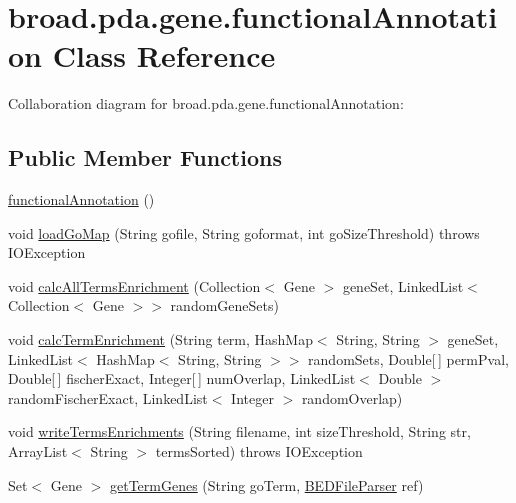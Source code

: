 \hypertarget{classbroad_1_1pda_1_1gene_1_1functional_annotation}{\section{broad.\+pda.\+gene.\+functional\+Annotation Class Reference}
\label{classbroad_1_1pda_1_1gene_1_1functional_annotation}
}


Collaboration diagram for broad.\+pda.\+gene.\+functional\+Annotation\+:
\subsection*{Public Member Functions}
\begin{DoxyCompactItemize}
\item 
\hyperlink{classbroad_1_1pda_1_1gene_1_1functional_annotation_a610cf5380473ec0fda037c2ab921003e}{functional\+Annotation} ()
\item 
void \hyperlink{classbroad_1_1pda_1_1gene_1_1functional_annotation_a9577d6182490e3abafc8fbd513e2f283}{load\+Go\+Map} (String gofile, String goformat, int go\+Size\+Threshold)  throws I\+O\+Exception
\item 
void \hyperlink{classbroad_1_1pda_1_1gene_1_1functional_annotation_a5c2ba1d1acf76ae8f19dbbf79c775984}{calc\+All\+Terms\+Enrichment} (Collection$<$ Gene $>$ gene\+Set, Linked\+List$<$ Collection$<$ Gene $>$$>$ random\+Gene\+Sets)
\item 
void \hyperlink{classbroad_1_1pda_1_1gene_1_1functional_annotation_aa3f877452e95fde1ff2eb5520e318856}{calc\+Term\+Enrichment} (String term, Hash\+Map$<$ String, String $>$ gene\+Set, Linked\+List$<$ Hash\+Map$<$ String, String $>$$>$ random\+Sets, Double\mbox{[}$\,$\mbox{]} perm\+Pval, Double\mbox{[}$\,$\mbox{]} fischer\+Exact, Integer\mbox{[}$\,$\mbox{]} num\+Overlap, Linked\+List$<$ Double $>$ random\+Fischer\+Exact, Linked\+List$<$ Integer $>$ random\+Overlap)
\item 
void \hyperlink{classbroad_1_1pda_1_1gene_1_1functional_annotation_a301b4ade3bdb606e88102eba5a51ac8a}{write\+Terms\+Enrichments} (String filename, int size\+Threshold, String str, Array\+List$<$ String $>$ terms\+Sorted)  throws I\+O\+Exception
\item 
Set$<$ Gene $>$ \hyperlink{classbroad_1_1pda_1_1gene_1_1functional_annotation_ac25fe9ebfabb92cd739c154cdc55d2e2}{get\+Term\+Genes} (String go\+Term, \hyperlink{classbroad_1_1pda_1_1annotation_1_1_b_e_d_file_parser}{B\+E\+D\+File\+Parser} ref)
\end{DoxyCompactItemize}
